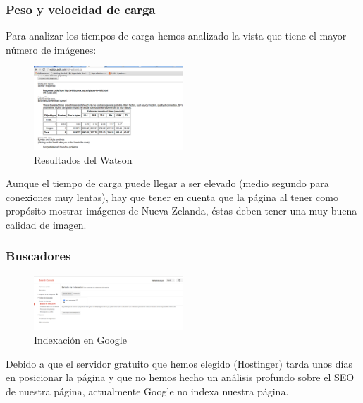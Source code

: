 \subsubsection{Peso y velocidad de carga}
Para analizar los tiempos de carga hemos analizado la vista que tiene el mayor número de imágenes:
\begin{figure}[h]
	\centering
	\includegraphics[width=0.50\textwidth]{./Fotos/watson.png}
	\caption{Resultados del Watson}
	\label{fig: Resultados del Watson}
\end{figure}
Aunque el tiempo de carga puede llegar a ser elevado (medio segundo para conexiones muy lentas), hay que tener en cuenta que la página al tener como propósito mostrar imágenes de Nueva Zelanda, éstas deben tener una muy buena calidad de imagen.
\clearpage
\subsubsection{Buscadores}
\begin{figure}[h]
	\centering
	\includegraphics[width=0.50\textwidth]{./Fotos/indexacion.png}
	\caption{Indexación en Google}
	\label{fig: Indexación en Google}
\end{figure}
Debido a que el servidor gratuito que hemos elegido (Hostinger) tarda unos días en posicionar la página y que no hemos hecho un análisis profundo sobre el SEO de nuestra página, actualmente Google no indexa nuestra página.



